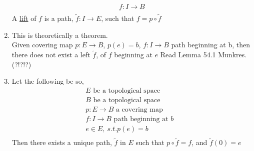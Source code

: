 \begin{enumerate}
\begin{definition}
\begin{align*}
                    f: I \rightarrow B\\
                \end{align*}
                A \underline{lift} of $f$ is a path, $\tilde{f}: I\rightarrow E$, such that
                $f=p\circ \tilde{f}$
            \end{definition}
        \item 
            This is theoretically a theorem.\\
            Given covering map $p:E\rightarrow B$, $p(e)=b$,
            $f:I \rightarrow B$ path beginning at b, then there does not exist a left $\tilde{f}$,
            of $f$ beginning at $e$ Read Lemma 54.1 Munkres. (?!?!?)
        \item
            \begin{theorem}
            Let the following be so,
            \begin{align*}
                E \text{ be a topological space}\\
                B \text{ be a topological space}\\
                p:E \rightarrow B \text{ a covering map}\\
                f:I \rightarrow B \text{ path beginning at $b$ }\\
                e \in E,\ s.t. p(e)=b\\
            \end{align*}
            Then there exists a unique path, $\tilde{f}$ in $E$ such that $p\circ \tilde{f}=f$, and
            $\tilde{f}(0)=e$
            \end{theorem}
    \end{enumerate}
